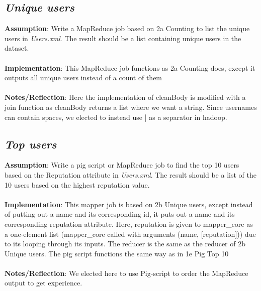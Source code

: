 \documentclass[fleqn,10pt]{wlscirep}
\begin{document}
\subsection{\emph{Unique users}}
\textbf{Assumption}: Write a MapReduce job based on 2a Counting to list the unique users in \textit{Users.xml}. The result should be a list containing unique users in the dataset. \\ \\
\textbf{Implementation}: This MapReduce job functions as 2a Counting does, except it outputs all unique users instead of a count of them \\ \\
\textbf{Notes/Reflection}: Here the implementation of cleanBody is modified with a join function as cleanBody returns a list where we want a string. Since usernames can contain spaces, we elected to instead use | as a separator in hadoop.
 

\subsection{\emph{Top users}}
\textbf{Assumption}: Write a pig script or MapReduce job to find the top 10 users based on the Reputation attribute in \textit{Users.xml}. The result should be a list of the 10 users based on the highest reputation value. \\ \\
\textbf{Implementation}: This mapper job is based on 2b Unique users, except instead of putting out a name and its corresponding id, it puts out a name and its corresponding reputation attribute. Here, reputation is given to mapper\_core as a one-element list (mapper\_core called with arguments (name, [reputation])) due to its looping through its inputs. The reducer is the same as the reducer of 2b Unique users. The pig script functions the same way as in 1e Pig Top 10\\ \\
\textbf{Notes/Reflection}: We elected here to use Pig-script to order the MapReduce output to get experience.

\end{document}
